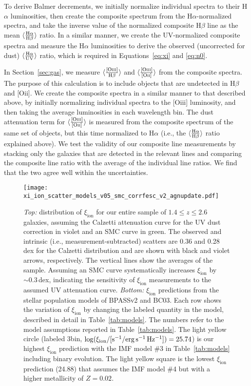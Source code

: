 \documentclass[iop]{emulateapj}
\newcommand{\xiion}{\ensuremath{\xi_{\mathrm{ion}}}}
\newcommand{\halpha}{H\ensuremath{\alpha}}
\newcommand{\hbeta}{H\ensuremath{\beta}}
\begin{document}
To derive Balmer decrements, we initially normalize individual spectra to their {\halpha} luminosities, then create the composite spectrum from the {\halpha}-normalized spectra, and take the inverse value of the normalized composite {\hbeta} line as the mean $\langle \frac{\rm H\alpha}{\rm H\beta}\rangle$ ratio. In a similar manner, we create the UV-normalized composite spectra and measure the {\halpha} luminosities to derive the observed (uncorrected for dust) $\langle \frac{\rm H\alpha}{\rm UV}\rangle$ ratio, which is required in Equations~\ref{eq:xi} and \ref{eq:n0}. 

In Section~\ref{sec:gas}, we measure $\langle \frac{\rm [O{\normalfont\textsc{iii}}]}{\rm H\beta}\rangle$ and $\langle \frac{\rm [O{\normalfont\textsc{iii}}]}{\rm [O{\normalfont\textsc{ii}}]}\rangle$ from the composite spectra. The purpose of this calculation is to include objects that are undetected in {\hbeta} and [O{\sc ii}]. We create the composite spectra in a similar manner to that described above, by initially normalizing individual spectra to the [O{\sc iii}] luminosity, and then taking the average luminosities in each wavelength bin. The dust attenuation term for $\langle \frac{\rm [O{\normalfont\textsc{iii}}]}{\rm [O{\normalfont\textsc{ii}}]}\rangle$ is measured from the composite spectrum of the same set of objects, but this time normalized to {\halpha} (i.e., the $\langle \frac{\rm H\alpha}{\rm H\beta}\rangle$ ratio explained above).
We test the validity of our composite line measurements by stacking only the galaxies that are detected in the relevant lines and comparing the composite line ratio with the average of the individual line ratios. We find that the two agree well within the uncertainties.

\begin{figure*}[tbp]
	\centering
		\texttt{[image: xi\_ion\_scatter\_models\_v05\_smc\_corrfesc\_v2\_agnupdate.pdf]}
		\caption{{\em Top:} distribution of {\xiion} for our entire sample of $1.4\leq z\leq 2.6$ galaxies, assuming the Calzetti attenuation curve for the UV dust correction in violet and an SMC curve in green. The observed and intrinsic (i.e., measurement-subtracted) scatters are 0.36 and 0.28\,dex for the Calzetti distribution and are shown with black and violet arrows, respectively. The vertical lines show the averages of the sample. Assuming an SMC curve systematically increases {\xiion} by $\sim 0.3$\,dex, indicating the sensitivity of {\xiion} measurements to the assumed UV attenuation curve.
		{\em Bottom:} {\xiion} predictions from the stellar population models of BPASSv2 and BC03. Each row shows the variation of {\xiion} by changing the labeled quantity in the model, described in detail in Table~\ref{tab:models}. The numbers refer to the model assumptions reported in Table~\ref{tab:models}. The light yellow circle (labeled 3bin, $\log(\xi_{\rm{ion}}/[{\rm{s^{-1}/erg\,s^{-1}\,Hz^{-1}}}])=25.74$) is our highest {\xiion} prediction with the IMF model \#3 in Table~\ref{tab:models} including binary evolution. The light yellow square is the lowest {\xiion} prediction (24.88) that assumes the IMF model \#4 but with a higher metallicity of $Z=0.02$.
		}
		\label{fig:scatter}
\end{figure*}
\end{document}
